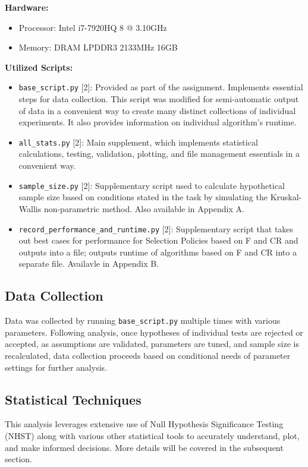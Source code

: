 \documentclass[12pt,a4paper]{article}
\begin{document}
\textbf{Hardware:}
\begin{itemize}
    \item Processor: Intel i7-7920HQ 8 @ 3.10GHz
    \item Memory: DRAM LPDDR3 2133MHz 16GB
\end{itemize}

\textbf{Utilized Scripts:}
\begin{itemize}
    \item \texttt{base\_script.py} [2]: Provided as part of the assignment. Implements essential steps for data collection. This script was modified for semi-automatic output of data in a convenient way to create many distinct collections of individual experiments. It also provides information on individual algorithm's runtime.
    \item \texttt{all\_stats.py} [2]: Main supplement, which implements statistical calculations, testing, validation, plotting, and file management essentials in a convenient way.
    \item \texttt{sample\_size.py} [2]: Supplementary script used to calculate hypothetical sample size based on conditions stated in the task by simulating the Kruskal-Wallis non-parametric method. Also available in Appendix A.
    \item \texttt{record\_performance\_and\_runtime.py} [2]: Supplementary script that takes out best cases for performance for Selection Policies based on F and CR and outputs into a file; outputs runtime of algorithms based on F and CR into a separate file. Availavle in Appendix B.
\end{itemize}

\subsection{Data Collection}
Data was collected by running \texttt{base\_script.py} multiple times with various parameters. Following analysis, once hypotheses of individual tests are rejected or accepted, as assumptions are validated, parameters are tuned, and sample size is recalculated, data collection proceeds based on conditional needs of parameter settings for further analysis.

\subsection{Statistical Techniques}
This analysis leverages extensive use of Null Hypothesis Significance Testing (NHST) along with various other statistical tools to accurately understand, plot, and make informed decisions. More details will be covered in the subsequent section.
\end{document}
